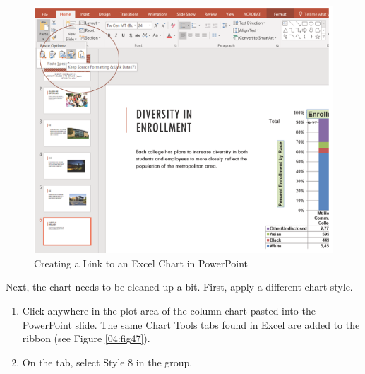 \begin{figure}[H]
	\centering
	\includegraphics[width=\maxwidth{.95\linewidth}]{gfx/ch04_fig46}
	\caption{Creating a Link to an Excel Chart in PowerPoint}
	\label{04:fig46}
\end{figure}

Next, the chart needs to be cleaned up a bit. First, apply a different chart style.

\begin{enumerate}
	\item Click anywhere in the plot area of the column chart pasted into the PowerPoint slide. The same Chart Tools tabs found in Excel are added to the ribbon (see Figure \ref{04:fig47}). 
	\item On the  tab, select Style $ 8 $ in the  group.
\end{enumerate}

